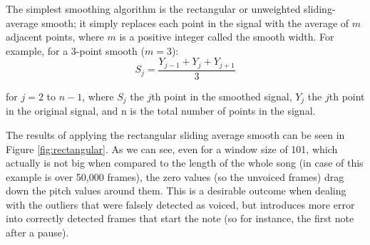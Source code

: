 The simplest smoothing algorithm is the rectangular or unweighted sliding-average smooth; it simply replaces each point in the signal with the average of $m$ adjacent points, where $m$ is a positive integer called the smooth width. For example, for a 3-point smooth ($m = 3$):
\begin{equation}
	S_{j} = \frac{Y_{j-1} + Y_{j} + Y_{j+1}}{3}
\end{equation}

for $j = 2$ to $n-1$, where $S_{j}$ the $j$th point in the smoothed signal, $Y_{j}$ the $j$th point in the original signal, and n is the total number of points in the signal. 


The results of applying the rectangular sliding average smooth can be seen in Figure \ref{fig:rectangular}. As we can see, even for a window size of 101, which actually is not big when compared to the length of the whole song (in case of this example is over 50,000 frames), the zero values (so the unvoiced frames) drag down the pitch values around them. This is a desirable outcome when dealing with the outliers that were falsely detected as voiced, but introduces more error into correctly detected frames that start the note (so for instance, the first note after a pause).

